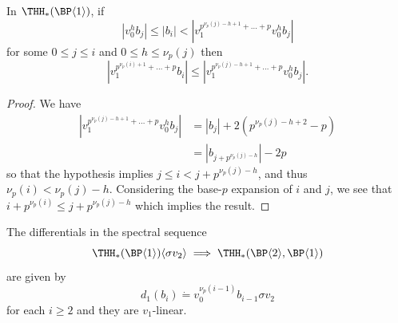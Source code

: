 \begin{lemma} \label{lem:thhell2}
  In $\THH_*(\BP\langle 1\rangle)$, if
  \begin{equation}
    |v_0^hb_j| \leq | b_i| < | v_1^{p^{\nu_p(j) - h + 1} + \dots + p} v_0^hb_j |
  \end{equation}
  for some $ 0 \leq j \leq i$ and $0 \leq h \leq \nu_p(j)$ then
  \begin{equation}
    | v_1^{p^{\nu_p(i) + 1} + \dots + p} b_i | \leq | v_1^{p^{\nu_p(j) - h + 1} + \dots + p} v_0^hb_j |.
  \end{equation}
\end{lemma}

\begin{proof}
  We have
  \begin{equation}
    \begin{aligned}
      | v_1^{p^{\nu_p(j) - h + 1} + \dots + p} v_0^hb_j |
      & = |b_j| + 2(p^{\nu_p(j) - h + 2} - p) \\
      & = |b_{j + p^{\nu_p(j) - h}} | - 2p
    \end{aligned}
  \end{equation}
  so that the hypothesis implies $j \leq i < j + p^{\nu_p(j) - h}$, and thus $\nu_p(i) < \nu_p(j) - h$. Considering the base-$p$ expansion of $i$ and $j$, we see that $ i + p^{\nu_p(i)} \leq j + p^{\nu_p(j) - h}$ which implies the result.
\end{proof}

\begin{proposition}\label{theorem:differentialellcoeff}
The differentials in the spectral sequence
\[ 
\THH_*(\BP\langle 1\rangle)\langle \sigma v_2\rangle \implies \THH_*(\BP\langle 2\rangle,\BP\langle 1\rangle)
\]
are given by 
\begin{equation}
  d_1(b_i)\dot{=} v_0^{\nu_p(i-1)}b_{i-1} \sigma v_2
\end{equation}
for each $i \geq 2$ and they are $v_1$-linear.
\end{proposition}


